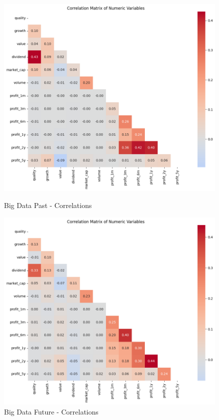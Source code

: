 \documentclass[11pt,english,a4paper,hidelinks]{book}
\begin{document}
\begin{figure}[H]
    \centering
    \begin{minipage}{0.48\textwidth}
        \centering
        \includegraphics[width=\linewidth]{images/code/descriptive analysis/correlations/Big Data Past.png}
        \caption{Big Data Past - Correlations}
        \label{fig:big_data_past_correlations}
    \end{minipage}\hfill
    \begin{minipage}{0.48\textwidth}
        \centering
        \includegraphics[width=\linewidth]{images/code/descriptive analysis/correlations/Big Data future.png}
        \caption{Big Data Future - Correlations}
        \label{fig:big_data_future_correlations}
    \end{minipage}
\end{figure}
\end{document}
